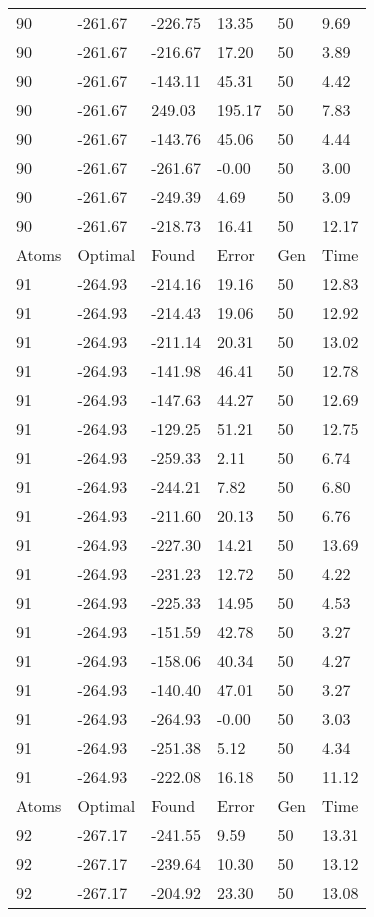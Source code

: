 \documentclass{report}
\begin{document}
\begin{appendix}
\begin{longtable}{llllll}
90 & -261.67 & -226.75 & 13.35 & 50 & 9.69 \\
90 & -261.67 & -216.67 & 17.20 & 50 & 3.89 \\
90 & -261.67 & -143.11 & 45.31 & 50 & 4.42 \\
90 & -261.67 & 249.03 & 195.17 & 50 & 7.83 \\
90 & -261.67 & -143.76 & 45.06 & 50 & 4.44 \\
90 & -261.67 & -261.67 & -0.00 & 50 & 3.00 \\
90 & -261.67 & -249.39 & 4.69 & 50 & 3.09 \\
90 & -261.67 & -218.73 & 16.41 & 50 & 12.17 \\
Atoms & Optimal & Found & Error & Gen & Time \\
91 & -264.93 & -214.16 & 19.16 & 50 & 12.83 \\
91 & -264.93 & -214.43 & 19.06 & 50 & 12.92 \\
91 & -264.93 & -211.14 & 20.31 & 50 & 13.02 \\
91 & -264.93 & -141.98 & 46.41 & 50 & 12.78 \\
91 & -264.93 & -147.63 & 44.27 & 50 & 12.69 \\
91 & -264.93 & -129.25 & 51.21 & 50 & 12.75 \\
91 & -264.93 & -259.33 & 2.11 & 50 & 6.74 \\
91 & -264.93 & -244.21 & 7.82 & 50 & 6.80 \\
91 & -264.93 & -211.60 & 20.13 & 50 & 6.76 \\
91 & -264.93 & -227.30 & 14.21 & 50 & 13.69 \\
91 & -264.93 & -231.23 & 12.72 & 50 & 4.22 \\
91 & -264.93 & -225.33 & 14.95 & 50 & 4.53 \\
91 & -264.93 & -151.59 & 42.78 & 50 & 3.27 \\
91 & -264.93 & -158.06 & 40.34 & 50 & 4.27 \\
91 & -264.93 & -140.40 & 47.01 & 50 & 3.27 \\
91 & -264.93 & -264.93 & -0.00 & 50 & 3.03 \\
91 & -264.93 & -251.38 & 5.12 & 50 & 4.34 \\
91 & -264.93 & -222.08 & 16.18 & 50 & 11.12 \\
Atoms & Optimal & Found & Error & Gen & Time \\
92 & -267.17 & -241.55 & 9.59 & 50 & 13.31 \\
92 & -267.17 & -239.64 & 10.30 & 50 & 13.12 \\
92 & -267.17 & -204.92 & 23.30 & 50 & 13.08 \\

\end{longtable}
\end{appendix}
\end{document}
